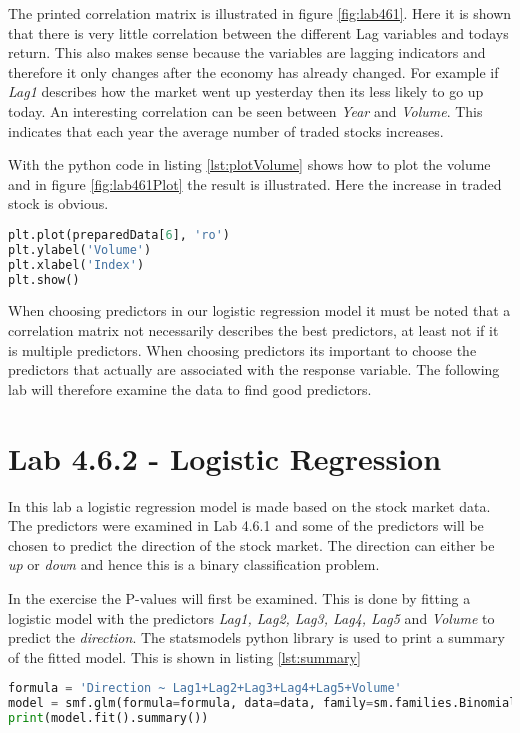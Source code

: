 The printed correlation matrix is illustrated in figure \ref{fig:lab461}. Here it is shown that there is very little correlation between the different Lag variables and todays return. This also makes sense because the variables are lagging indicators and therefore it only changes after the economy has already changed. For example if \emph{Lag1} describes how the market went up yesterday then its less likely to go up today. An interesting correlation can be seen between \emph{Year} and \emph{Volume}. This indicates that each year the average number of traded stocks increases. 

\FloatBarrier

With the python code in listing \ref{lst:plotVolume} shows how to plot the volume and in figure \ref{fig:lab461Plot} the result is illustrated. Here the increase in traded stock is obvious.
\begin{lstlisting}[language=Python, label=lst:plotVolume, caption=Plot Volume]
plt.plot(preparedData[6], 'ro')
plt.ylabel('Volume')
plt.xlabel('Index')
plt.show()
\end{lstlisting}


When choosing predictors in our logistic regression model it must be noted that a correlation matrix not necessarily describes the best predictors, at least not if it is multiple predictors. When choosing predictors its important to choose the predictors that actually are associated with the response variable. The following lab will therefore examine the data to find good predictors.

\section{Lab 4.6.2 - Logistic Regression}
\label{sec:lab462}
In this lab a logistic regression model is made based on the stock market data. The predictors were examined in Lab 4.6.1 and some of the predictors will be chosen to predict the direction of the stock market. The direction can either be \emph{up} or \emph{down} and hence this is a binary classification problem.

In the exercise the P-values will first be examined. This is done by fitting a logistic model with the predictors \emph{Lag1, Lag2, Lag3, Lag4, Lag5} and \emph{Volume} to predict the \emph{direction}. The statsmodels python library is used to print a summary of the fitted model. This is shown in listing \ref{lst:summary}
\begin{lstlisting}[language=Python, label=lst:summary, caption=Print summary]
formula = 'Direction ~ Lag1+Lag2+Lag3+Lag4+Lag5+Volume'
model = smf.glm(formula=formula, data=data, family=sm.families.Binomial())
print(model.fit().summary())
\end{lstlisting}

